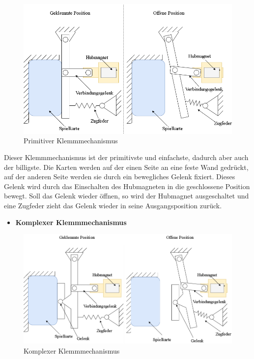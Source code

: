 \begin{figure}[H]
    \centering
    \includegraphics[scale=0.45,page=1]{fig/mech/Klemmmechanissmus-Page-1.png}
    \caption{Primitiver Klemmmechanismus}
\end{figure}

Dieser Klemmmechanismus ist der primitivste und einfachste, dadurch aber auch der billigste.
Die Karten werden auf der einen Seite an eine feste Wand gedrückt, auf der anderen Seite werden sie durch ein bewegliches Gelenk fixiert.
Dieses Gelenk wird durch das Einschalten des Hubmagneten in die geschlossene Position bewegt.
Soll das Gelenk wieder öffnen, so wird der Hubmagnet ausgeschaltet und eine Zugfeder zieht das Gelenk wieder in seine Ausgangsposition zurück.

\begin{itemize}
    \item \textbf{Komplexer Klemmmechanismus}
\end{itemize}

\begin{figure}[H]
    \centering
    \includegraphics[scale=0.45,page=1]{fig/mech/Klemmmechanissmus-Page-2.png}
    \caption{Komplexer Klemmmechanismus}
\end{figure}

